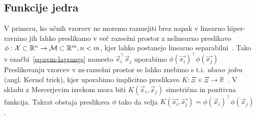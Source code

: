 \subsection{Funkcije jedra}
V primeru, ko učnih vzorcev ne moremo razmejiti brez napak v linearno hiper-ravnino jih lahko preslikamo v več razsežni prostor z nelinearno preslikavo $\phi: \mathcal{X} \subset \mathbb{R}^n \to \mathcal{M} \subset \mathbb{R}^m, n < m$, kjer lahko postanejo linearno separabilni~\cite{chapelle1999support,boughorbel2005generalized}. Tako v enačbi~\eqref{eq:svm-lagrange} namesto $\vec{x}_i^\top\vec{x}_j$ uporabimo $\phi(\vec{x_i})^\top\phi(\vec{x_j})$ Preslikovanju vzorcev v m-razsežni prostor se lahko znebimo s t.i. \emph{ukano jedra} (angl. Kernel trick), kjer uporabimo implicitno preslikavo $K: \mathcal{\Xi} \times \mathcal{\Xi} \to \mathbb{R}$~\cite{boughorbel2005generalized}. V skladu z Mercerjevim izrekom mora biti $K(\vec{x}_i,\vec{x}_j)$ simetrična in pozitivna funkcija. Takrat obstaja preslikava $\phi$ tako da velja $K(\vec{x_i}, \vec{x_j}) = \phi(\vec{x}_i)^\top\phi(\vec{x}_j)$.


